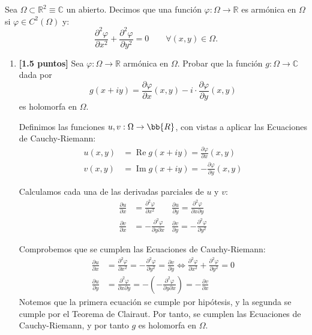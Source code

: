 \documentclass[12pt]{article}
\renewcommand{\Re}{\operatorname{Re}} %
\renewcommand{\Im}{\operatorname{Im}}
\begin{document}
    \begin{ejercicio}[3 puntos] Sea $\Omega \subset \mathbb{R}^2 \equiv \mathbb{C}$ un abierto. Decimos que una función $\varphi : \Omega \to \mathbb{R}$ es armónica en $\Omega$ si $\varphi \in C^2(\Omega)$ y:
    \begin{equation*}
        \frac{\partial^2 \varphi}{\partial x^2} + \frac{\partial^2 \varphi}{\partial y^2} = 0\qquad \forall (x, y) \in \Omega.
    \end{equation*}

    \begin{enumerate}
        \item \textbf{[1.5 puntos]} Sea $\varphi : \Omega \to \mathbb{R}$ armónica en $\Omega$. Probar que la función $g : \Omega \to \mathbb{C}$ dada por
        $$g(x + iy) = \frac{\partial \varphi}{\partial x}(x, y) - i\cdot  \frac{\partial \varphi}{\partial y}(x, y)$$
        es holomorfa en $\Omega$.

        Definimos las funciones $u,v:\Omega\to \bb{R}$, con vistas a aplicar las Ecuaciones de Cauchy-Riemann:
        \begin{align*}
            u(x,y) &= \Re g(x+iy) = \frac{\partial \varphi}{\partial x}(x, y)\\
            v(x,y) &= \Im g(x+iy) = -\frac{\partial \varphi}{\partial y}(x, y)
        \end{align*}

        Calculamos cada una de las derivadas parciales de $u$ y $v$:
        \begin{align*}
            \frac{\partial u}{\partial x} &= \frac{\partial^2 \varphi}{\partial x^2}&
            \frac{\partial u}{\partial y} = \frac{\partial^2 \varphi}{\partial x \partial y}\\
            \frac{\partial v}{\partial x} &= -\frac{\partial^2 \varphi}{\partial y \partial x}&
            \frac{\partial v}{\partial y} = -\frac{\partial^2 \varphi}{\partial y^2}
        \end{align*}

        Comprobemos que se cumplen las Ecuaciones de Cauchy-Riemann:
        \begin{align*}
            \frac{\partial u}{\partial x} &= \frac{\partial^2 \varphi}{\partial x^2} = -\frac{\partial^2 \varphi}{\partial y^2} = \frac{\partial v}{\partial y}\iff \frac{\partial^2 \varphi}{\partial x^2} + \frac{\partial^2 \varphi}{\partial y^2} = 0\\
            \frac{\partial u}{\partial y} &= \frac{\partial^2 \varphi}{\partial x \partial y} = -\left(-\frac{\partial^2 \varphi}{\partial y \partial x}\right) = -\frac{\partial v}{\partial x}
        \end{align*}
        Notemos que la primera ecuación se cumple por hipótesis, y la segunda se cumple por el Teorema de Clairaut. Por tanto, se cumplen las Ecuaciones de Cauchy-Riemann, y por tanto $g$ es holomorfa en $\Omega$.


\end{enumerate}
\end{ejercicio}
\end{document}
